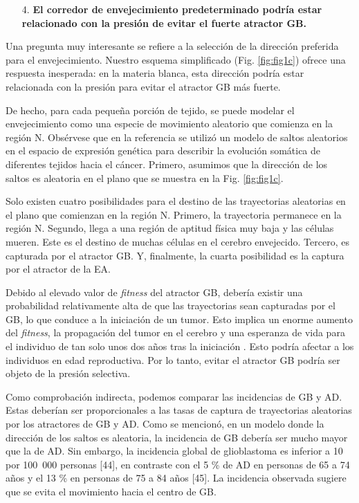 \begin{enumerate}
	\item[4.] \textbf{El corredor de envejecimiento predeterminado podría estar relacionado con la presión de evitar el fuerte atractor GB.}
\end{enumerate}

Una pregunta muy interesante se refiere a la selección de la dirección preferida para el envejecimiento. Nuestro esquema simplificado (Fig. \ref{fig:fig1c}) ofrece una respuesta inesperada: en la materia blanca, esta dirección podría estar relacionada con la presión para evitar el atractor GB más fuerte.

De hecho, para cada pequeña porción de tejido, se puede modelar el envejecimiento como una especie de movimiento aleatorio que comienza en la región N. Obsérvese que en la referencia \cite{Herrero_2022} se utilizó un modelo de saltos aleatorios en el espacio de expresión genética para describir la evolución somática de diferentes tejidos hacia el cáncer. Primero, asumimos que la dirección de los saltos es aleatoria en el plano que se muestra en la Fig. \ref{fig:fig1c}.

Solo existen cuatro posibilidades para el destino de las trayectorias aleatorias en el plano que comienzan en la región N. Primero, la trayectoria permanece en la región N. Segundo, llega a una región de aptitud física muy baja y las células mueren. Este es el destino de muchas células en el cerebro envejecido. Tercero, es capturada por el atractor GB. Y, finalmente, la cuarta posibilidad es la captura por el atractor de la EA.

Debido al elevado valor de \textit{fitness} del atractor GB, debería existir una probabilidad relativamente alta de que las trayectorias sean capturadas por el GB, lo que conduce a la iniciación de un tumor. Esto implica un enorme aumento del \textit{fitness}, la propagación del tumor en el cerebro y una esperanza de vida para el individuo de tan solo unos dos años tras la iniciación \cite{Poon_2020}. Esto podría afectar a los individuos en edad reproductiva. Por lo tanto, evitar el atractor GB podría ser objeto de la presión selectiva.

Como comprobación indirecta, podemos comparar las incidencias de GB y AD. Estas deberían ser proporcionales a las tasas de captura de trayectorias aleatorias por los atractores de GB y AD. Como se mencionó, en un modelo donde la dirección de los saltos es aleatoria, la incidencia de GB debería ser mucho mayor que la de AD. Sin embargo, la incidencia global de glioblastoma es inferior a 10 por 100 000 personas [44], en contraste con el 5 \% de AD en personas de 65 a 74 años y el 13 \% en personas de 75 a 84 años [45]. La incidencia observada sugiere que se evita el movimiento hacia el centro de GB.